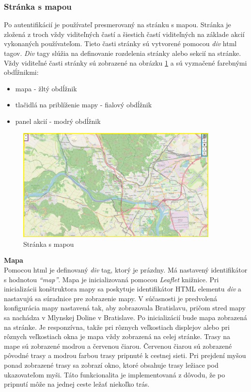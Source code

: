 \subsubsection{Stránka s mapou}

Po autentifikácií je používateľ presmerovaný na stránku s mapou. Stránka je zložená z troch vždy viditeľných častí a šiestich častí viditeľných na základe akcií vykonaných používateľom. Tieto časti stránky sú vytvorené pomocou \textit{div} \acrshort{html} tagov. \textit{Div} tagy slúžia na definovanie rozdelenia stránky alebo sekcií na stránke. Vždy viditeľné časti stránky sú zobrazené na obrázku \ref{fig:map} a sú vyznačené farebnými obdĺžnikmi:
\begin{itemize}
  \item mapa - žltý obdĺžnik
  \item tlačidlá na priblíženie mapy - fialový obdĺžnik
  \item panel akcií - modrý obdĺžnik
\end{itemize}
\begin{figure}[H]
  \centering
  \includegraphics[width=0.9\textwidth]{img/map.png}
  \caption{Stránka s mapou}
  \label{fig:map}
\end{figure}

\noindent\textbf{Mapa}\\
\indent Pomocou \acrshort{html} je definovaný \textit{div} tag, ktorý je prázdny. Má nastavený identifikátor s hodnotou \textit{``map''}. Mapa je inicializovaná pomocou \textit{Leaflet} knižnice\cite{leaflet}. Pri inicializácii konštruktora mapy sa poskytuje identifikátor HTML elementu \textit{div} a nastavujú sa súradnice pre zobrazenie mapy. V súčasnosti je predvolená konfigurácia mapy nastavená tak, aby zobrazovala Bratislavu, pričom stred mapy sa nachádza v Mlynskej Doline v Bratislave. Po inicializácií bude mapa zobrazená na stránke. Je responzívna, takže pri rôznych veľkostiach displejov alebo pri rôznych veľkostiach okna je mapa vždy zobrazená na celej stránke.  Trasy na mape sú zobrazené modrou a červenou čiarou. Červenou čiarou sú zobrazené pôvodné trasy a modrou farbou trasy pripnuté k cestnej sieti. Pri prejdení myšou ponad zobrazené trasy sa zobrazí okno, ktoré obsahuje trasy ležiace pod ukazovateľom myši. Táto funkcionalita je implementovaná z dôvodu, že po pripnutí môže na jednej ceste ležať niekoľko trás.  \\

